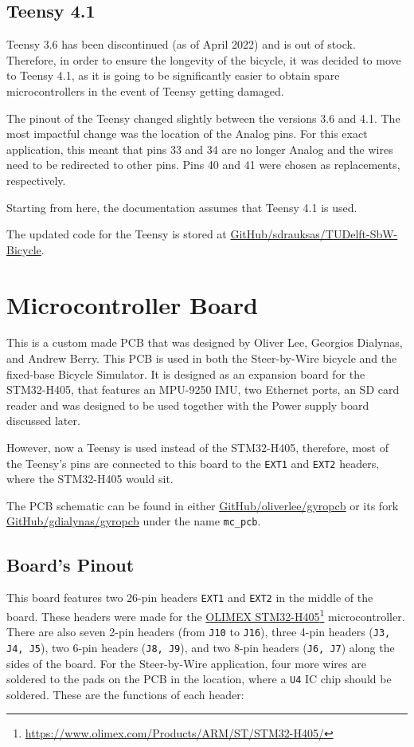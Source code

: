 \subsection{Teensy 4.1}
Teensy 3.6 has been discontinued (as of April 2022) and is out of stock. Therefore, in order to ensure the longevity of the bicycle, it was decided to move to Teensy 4.1, as it is going to be significantly easier to obtain spare microcontrollers in the event of Teensy getting damaged.

The pinout of the Teensy changed slightly between the versions 3.6 and 4.1. The most impactful change was the location of the Analog pins. For this exact application, this meant that pins 33 and 34 are no longer Analog and the wires need to be redirected to other pins. Pins 40 and 41 were chosen as replacements, respectively.

Starting from here, the documentation assumes that Teensy 4.1 is used.

The updated code for the Teensy is stored at \href{https://github.com/sdrauksas/TUDelft-SbW-Bicycle}{GitHub/sdrauksas/TUDelft-SbW-Bicycle}.


\section{Microcontroller Board}
This is a custom made PCB that was designed by Oliver Lee, Georgios Dialynas, and Andrew Berry. This PCB is used in both the Steer-by-Wire bicycle and the fixed-base Bicycle Simulator. It is designed as an expansion board for the STM32-H405, that features an MPU-9250 IMU, two Ethernet ports, an SD card reader and was designed to be used together with the Power supply board discussed later.

However, now a Teensy is used instead of the STM32-H405, therefore, most of the Teensy's pins are connected to this board to the \verb|EXT1| and \verb|EXT2| headers, where the STM32-H405 would sit.

The PCB schematic can be found in either \href{https://github.com/oliverlee/gyropcb}{GitHub/oliverlee/gyropcb} or its fork \href{https://github.com/gdialynas/gyropcb}{GitHub/gdialynas/gyropcb} under the name \verb|mc_pcb|.

\subsection{Board's Pinout}
This board features two 26-pin headers \verb|EXT1| and \verb|EXT2| in the middle of the board. These headers were made for the \href{https://www.olimex.com/Products/ARM/ST/STM32-H405/}{OLIMEX STM32-H405}\footnote{\href{https://www.olimex.com/Products/ARM/ST/STM32-H405/}{https://www.olimex.com/Products/ARM/ST/STM32-H405/}} microcontroller. There are also seven 2-pin headers (from \verb|J10| to \verb|J16|), three 4-pin headers (\verb|J3, J4, J5|), two 6-pin headers (\verb|J8, J9|), and two 8-pin headers (\verb|J6, J7|) along the sides of the board. For the Steer-by-Wire application, four more wires are soldered to the pads on the PCB in the location, where a \verb|U4| IC chip should be soldered. These are the functions of each header:

